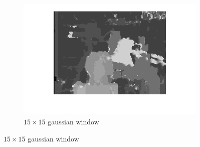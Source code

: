 \documentclass{article}
\begin{document}
\begin{figure}[ht!]
\begin{subfigure}{.3\textwidth}
  \centering
  \includegraphics[width=1\linewidth]{ex3/s15_15g.png}
  \caption{$15\times15$ gaussian window}
  \label{fig_s3} 
 \end{subfigure}
 

\end{figure}
\end{document}
